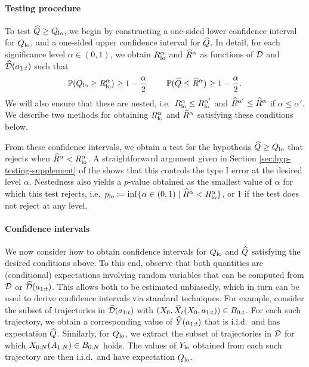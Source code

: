 %

%



\paragraph{Testing procedure}

%
%

To test $\widehat{Q} \geq Q_{\mathrm{lo}}$, we begin by constructing a one-sided lower confidence interval for $Q_{\mathrm{lo}}$, and a one-sided upper confidence interval for $\widehat{Q}$.
In detail, for each significance level $\alpha \in (0, 1)$, we obtain $R_{\mathrm{lo}}^{\alpha}$ and $\widehat{R}^{\alpha}$ as functions of $\mathcal{D}$ and $\widehat{\mathcal{D}}(a_{1:t})$ such that
\begin{equation}
    \mathbb{P}(Q_{\mathrm{lo}} \geq R_{\mathrm{lo}}^{\alpha}) \geq 1 - \frac{\alpha}{2} \qquad\,\, \mathbb{P}(\widehat{Q} \leq \widehat{R}^{\alpha}) \geq 1 - \frac{\alpha}{2}. \label{eq:q-confidence-interval-new}
\end{equation}
%
%
%
%
We will also ensure that these are nested, i.e.\ $R_{\mathrm{lo}}^{\alpha} \leq R_{\mathrm{lo}}^{\alpha'}$ and $\widehat{R}^{\alpha'} \leq \widehat{R}^{\alpha}$ if $\alpha \leq \alpha'$.
%
%
We describe two methods for obtaining $R_{\mathrm{lo}}^{\alpha}$ and $\widehat{R}^{\alpha}$ satisfying these conditions below.

From these confidence intervals, we obtain a test for the hypothesis $\widehat{Q} \geq Q_{\mathrm{lo}}$ that rejects when $\widehat{R}^{\alpha} < R_{\mathrm{lo}}^{\alpha}$.
A straightforward argument given in Section \ref{sec:hyp-testing-supplement} of the \AppendixName shows that this controls the type I error at the desired level $\alpha$.
%
Nestedness also yields a $p$-value obtained as the smallest value of $\alpha$ for which this test rejects, i.e.\
$p_{\textup{lo}} \coloneqq \inf\{\alpha \in (0, 1) \mid \text{$\widehat{R}^{\alpha} < R_{\mathrm{lo}}^{\alpha}$}\}$,
%
%
%
%
or $1$ if the test does not reject at any level.
%

\paragraph{Confidence intervals}

We now consider how to obtain confidence intervals for $Q_{\mathrm{lo}}$ and $\widehat{Q}$ satisfying the desired conditions above.
To this end, observe that both quantities are (conditional) expectations involving random variables that can be computed from $\mathcal{D}$ or $\widehat{\mathcal{D}}(a_{1:t})$.
This allows both to be estimated unbiasedly, which in turn can be used to derive confidence intervals via standard techniques.
For example, consider the subset of trajectories in $\widehat{\mathcal{D}}(a_{1:t})$ with $(X_0, \widehat{X}_{t}(X_0, a_{1:t})) \in B_{0:t}$.
For each such trajectory, we obtain a corresponding value of $\widehat{Y}(a_{1:t})$ that is i.i.d.\ and has expectation $\widehat{Q}$.
Similarly, for $Q_{\mathrm{lo}}$, we extract the subset of trajectories in $\mathcal{D}$ for which $X_{0:N}(A_{1:N}) \in B_{0:N}$ holds. %
The values of $Y_{\mathrm{lo}}$ obtained from each such trajectory are then i.i.d.\ and have expectation $Q_{\mathrm{lo}}$.

